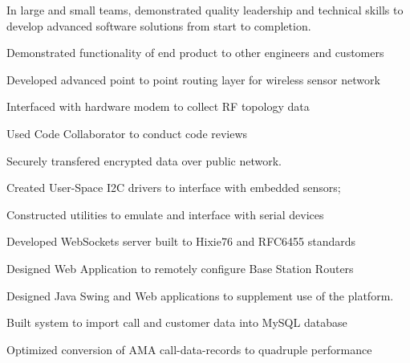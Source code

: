 \documentclass[letterpaper]{deedy-resume}
\begin{document}
\begin{minipage}[t]{0.66\textwidth}
\sectionspace




\vspace{\topsep}
In large and small teams, demonstrated quality leadership and technical skills to develop advanced
software solutions from start to completion.
\vspace{\topsep}
\begin{tightitemize}
\item Demonstrated functionality of end product to other engineers and customers
\item Developed advanced point to point routing layer for wireless sensor network
\item Interfaced with hardware modem to collect RF topology data
\item Used Code Collaborator to conduct code reviews
\item Securely transfered encrypted data over public network.
\item Created User-Space I2C drivers to interface with embedded sensors;
\item Constructed utilities to emulate and interface with serial devices
\item Developed WebSockets server built to Hixie76 and RFC6455 standards
\item Designed Web Application to remotely configure Base Station Routers
\end{tightitemize}

\sectionspace
\sectionspace


\vspace{\topsep}
\begin{tightitemize}
\item Designed Java Swing and Web applications to supplement use of the platform.
\item Built system to import call and customer data into MySQL database
\item Optimized conversion of AMA call-data-records to quadruple performance
\end{tightitemize}

\sectionspace




\end{minipage}
\end{document}
